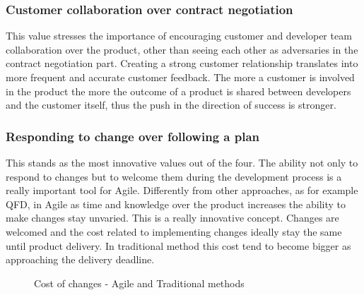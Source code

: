 \documentclass[../main.tex]{subfiles}
\begin{document}
\subsubsection{Customer collaboration over contract negotiation}
This value stresses the importance of encouraging customer and developer team collaboration over the product, other than seeing each other as adversaries in the contract negotiation part.
Creating a strong customer relationship translates into more frequent and accurate customer feedback. The more a customer is involved in the product the more the outcome of a product is shared between developers and the customer itself, thus the push in the direction of success is stronger.  
\subsubsection{Responding to change over following a plan}
This stands as the most innovative values out of the four. The ability not only to respond to changes but to welcome them during the development process is a really important tool for Agile. Differently from other approaches, as for example QFD, in Agile as time and knowledge over the product increases the ability to make changes stay unvaried. This is a really innovative concept. Changes are welcomed and the cost related to implementing changes ideally stay the same until product delivery. In traditional method this cost tend to become bigger as approaching the delivery deadline.
\begin{figure}[H]
\centering
{}
\caption{Cost of changes - Agile and Traditional methods}
    \label{fig:agilevswaterfall}
\end{figure}
\end{document}
